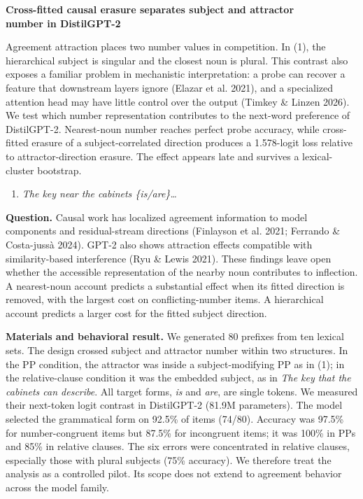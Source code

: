 \documentclass[12pt]{article}
\newcommand{\ex}[1]{\textit{#1}}
\begin{document}
\begin{center}
{\bfseries Cross-fitted causal erasure separates subject and attractor\\
number in DistilGPT-2}
\end{center}
\vspace{-0.65em}

Agreement attraction places two number values in competition. In (1), the
hierarchical subject is singular and the closest noun is plural. This contrast
also exposes a familiar problem in mechanistic interpretation: a probe can
recover a feature that downstream layers ignore (Elazar et al. 2021), and a
specialized attention head may have little control over the output (Timkey \&
Linzen 2026). We test which number representation contributes to the next-word
preference of DistilGPT-2. Nearest-noun number reaches perfect probe accuracy,
while cross-fitted erasure of a subject-correlated direction produces a
1.578-logit loss relative to attractor-direction erasure. The effect appears
late and survives a lexical-cluster bootstrap.

\begin{enumerate}[label=(\arabic*),leftmargin=2.2em,topsep=2pt]
\item \ex{The key near the cabinets \{is/are\}\ldots}
\end{enumerate}
\vspace{-0.1em}

\textbf{Question.}
Causal work has localized agreement information to model components and
residual-stream directions (Finlayson et al. 2021; Ferrando \& Costa-juss\`a
2024). GPT-2 also shows attraction effects compatible with similarity-based
interference (Ryu \& Lewis 2021). These findings leave open whether the
accessible representation of the nearby noun contributes to inflection.
A nearest-noun account predicts a substantial effect when its fitted direction
is removed, with the largest cost on conflicting-number items. A hierarchical
account predicts a larger cost for the fitted subject direction.

\textbf{Materials and behavioral result.}
We generated 80 prefixes from ten lexical sets. The design crossed subject and
attractor number within two structures. In the PP
condition, the attractor was inside a subject-modifying PP as in (1); in the
relative-clause condition it was the embedded subject, as in \ex{The key that
the cabinets can describe}. All target forms, \ex{is} and \ex{are}, are single
tokens. We measured their next-token logit contrast in DistilGPT-2
(81.9M parameters). The model selected the grammatical form on 92.5\% of items
(74/80). Accuracy was 97.5\% for number-congruent items but 87.5\% for
incongruent items; it was 100\% in PPs and 85\% in relative clauses. The six
errors were concentrated in relative clauses, especially those with plural
subjects (75\% accuracy). We therefore treat the analysis as a controlled pilot.
Its scope does not extend to agreement behavior across the model family.
\end{document}
